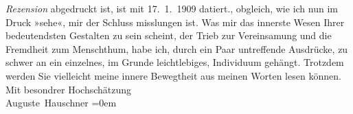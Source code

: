 \begin{ledgroupsized}[t]{13cm}
{{{                     \emph{Rezension} abgedruckt ist, ist mit 17. 1. 1909 datiert.}}}\label{K_L02587-1h}, obgleich, wie ich nun im
               Druck »sehe«,  mir der Schluss misslungen ist.
               Was mir das innerste Wesen Ihrer bedeutendsten Gestalten zu sein scheint, {\pb}der Trieb zur Vereinsamung und die Fremdheit zum Menschthum,
               habe ich, durch ein Paar untreffende Ausdrücke, zu schwer an ein einzelnes, im Grunde
               leichtlebiges, Individuum gehängt.\pend
           \pstart
           Trotzdem werden Sie vielleicht meine innere Bewegtheit aus meinen Worten lesen
               können.\pend
           \pstart
           Mit besondrer Hochschätzung{\\[\baselineskip]}\spacefill\mbox{Auguste Hauschner}\pend
           \leftskip=0em{}
         
         \endnumbering{}\end{ledgroupsized}  \newcommand{\dateiname}{L02587}\newcommand{\titel}{Auguste Hauschner an Arthur Schnitzler, 16. 1. 1909}\newcommand{\editorInnen}{Martin Anton Müller und Laura Untner}
      